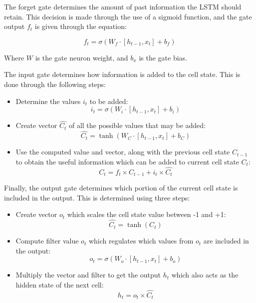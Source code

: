 The forget gate determines the amount of past information the LSTM should retain. This decision is made through the use of a sigmoid function, and the gate output $f_{t}$ is given through the equation:

\begin{equation}
    f_{t} = \sigma(W_{f}\cdot[h_{t-1}, x_{t}] + b_{f})
\end{equation}

Where $W$ is the gate neuron weight, and $b_{x}$ is the gate bias.\par

The input gate determines how information is added to the cell state. This is done through the following steps:
\begin{itemize}
    \item Determine the values $i_{t}$ to be added:
    \begin{equation}
        \label{eqn:input-gate}
        i_{t} = \sigma(W_{i}\cdot[h_{t-1}, x_{t}] + b_{i})
    \end{equation}
    \item Create vector $\hat{C_{t}}$ of all the possible values that may be added:
    \begin{equation}
        \hat{C_{t}} = \tanh( W_{C}\cdot[h_{t-1}, x_{t}] + b_{C})
    \end{equation}
    \item Use the computed value and vector, along with the previous cell state $C_{t-1}$ to obtain the useful information which can be added to current cell state $C_{t}$:
    \begin{equation}
        C_{t} = f_{t} \times C_{t-1} + i_{t} \times \hat{C_{t}}
    \end{equation}
\end{itemize}

Finally, the output gate determines which portion of the current cell state is included in the output. This is determined using three steps:
\begin{itemize}
    \item Create vector $o_{t}$ which scales the cell state value between -1 and +1:
    \begin{equation}
        \hat{C_{t}} = \tanh(C_{t})
    \end{equation}
    \item Compute filter value $o_{t}$ which regulates which values from $o_{t}$ are included in the output:
    \begin{equation}
        o_{t} = \sigma( W_{o}\cdot[h_{t-1}, x_{t}] + b_{o})
    \end{equation}
    \item Multiply the vector and filter to get the output $h_{t}$ which also acts as the hidden state of the next cell:
    \begin{equation}
        h_{t} = o_{t} \times \hat{C_{t}}
    \end{equation}
\end{itemize}

